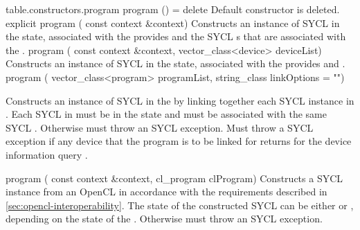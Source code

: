 {table.constructors.program}
  \addRow
    {program () = delete}
    {
      Default constructor is deleted.
    }
  \addRowTwoL
    {explicit program (}
    {const context \&context)}
    {
      Constructs an instance of SYCL  in the  state, associated with the  provides and the SYCL s that are associated with the .
    }
  \addRowThreeL
    {program (}
    {const context \&context,}
    {vector_class<device> deviceList)}
    {
      Constructs an instance of SYCL  in the  state, associated with the  provides and .
    }
  \addRowThreeL
    {program (}
    {vector_class<program> programList,}
    {string_class linkOptions = "")}
    {
      Constructs an instance of SYCL  in the  by linking together each SYCL  instance in . Each SYCL  in  must be in the  state and must be associated with the same SYCL . Otherwise must throw an  SYCL exception.  Must throw a  SYCL exception if any device that the program is to be linked for returns  for the device information query .

    }
  \addRowThreeL
    {program (}
    {const context \&context,}
    {cl_program clProgram)}
    {
      Constructs a SYCL  instance from an OpenCL  in accordance with the requirements described in \ref{sec:opencl-interoperability}. The state of the constructed SYCL  can be either  or , depending on the state of the . Otherwise must throw an  SYCL exception.
    }
\completeTable


